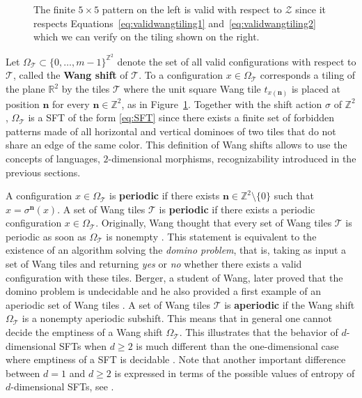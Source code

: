 \documentclass[12pt]{amsart}
\newcommand{\Z}{\mathbb{Z}}
\newcommand{\R}{\mathbb{R}}
\newcommand{\bn}{{\boldsymbol{n}}}
\newcommand{\Tcal}{\mathcal{T}}
\newcommand{\Zcal}{\mathcal{Z}}
\newcommand{\ifnv}[2]{\ifthenelse{\equal{#1}{}}{}{#2}}
\newcommand\defn[2][]{\ifnv{#1}{\index{#1|\textbf}}{\index{#2|\textbf}}\textbf{#2}}
\begin{document}
\begin{figure}[h]
\begin{center}
\end{center}
    \caption{The finite $5\times 5$ pattern on the left is valid with respect
    to $\Zcal$ since it respects Equations~\eqref{eq:validwangtiling1}
    and~\eqref{eq:validwangtiling2} which we can verify on the tiling shown on
    the right.}
    \label{fig:Z-5x5-tiling}
\end{figure}

Let $\Omega_\Tcal\subset\{0,\dots,m-1\}^{\Z^2}$ denote the set of all valid 
configurations with respect to $\Tcal$,
called the \defn{Wang shift} of $\Tcal$. 
To a configuration $x\in\Omega_\Tcal$ corresponds a tiling of the plane $\R^2$ by
the tiles $\Tcal$ where the unit square Wang tile $t_{x(\bn)}$ is placed at position $\bn$ for every
$\bn\in\Z^2$, as in Figure~\ref{fig:Z-5x5-tiling}.
Together with the shift action $\sigma$ of $\Z^2$,
$\Omega_\Tcal$ is a SFT of the form \eqref{eq:SFT}
since there exists a finite set of
forbidden patterns made of all horizontal and vertical dominoes of two tiles
that do not share an edge of the same color.
This definition of Wang shifts allows to use the concepts of languages,
$2$-dimensional morphisms, recognizability introduced in the previous sections.


A configuration $x\in\Omega_\Tcal$ is \defn{periodic} if there exists
$\bn\in\Z^2\setminus\{0\}$ such that $x=\sigma^\bn(x)$.
A set of Wang tiles $\Tcal$ is \defn{periodic} if there exists a periodic configuration
$x\in\Omega_\Tcal$. 
Originally, Wang thought that every set of Wang tiles $\Tcal$ is periodic 
as soon as $\Omega_\Tcal$ is nonempty \cite{wang_proving_1961}.
This statement is equivalent to the existence of an algorithm 
solving the \emph{domino problem}, that is, taking as input a set of Wang tiles
and returning \textit{yes} or \textit{no} whether there exists a valid
configuration with these tiles. 
Berger, a student of Wang, later proved that the domino problem is undecidable
and he also provided a first example of an aperiodic set of Wang tiles
\cite{MR0216954}.
A set of Wang tiles $\Tcal$ is \defn{aperiodic} if
the Wang shift $\Omega_\Tcal$ is a nonempty aperiodic subshift.
This means that in general one cannot decide the emptiness of a Wang shift
$\Omega_\Tcal$. This illustrates that the behavior of $d$-dimensional SFTs when $d\geq2$
is much different than the one-dimensional case where emptiness of a SFT is
decidable \cite{MR1369092}.
Note that another important difference between $d=1$ and $d\geq2$
is expressed in terms of the possible values of entropy of $d$-dimensional SFTs,
see \cite{MR2680402}.
\end{document}
